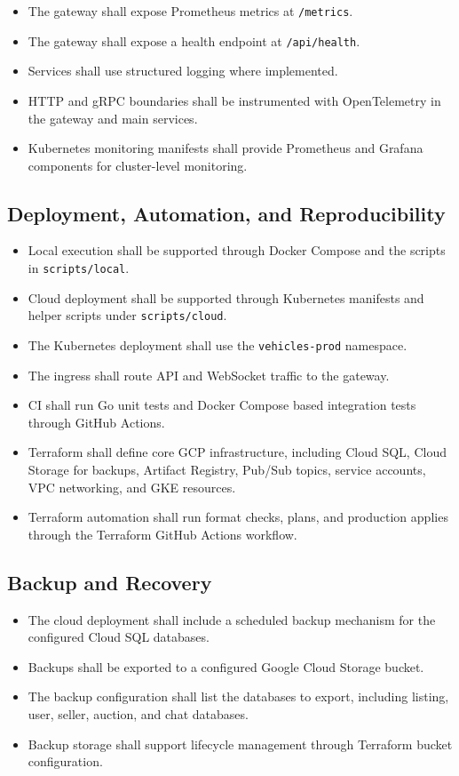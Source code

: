 \begin{itemize}
    \item The gateway shall expose Prometheus metrics at \texttt{/metrics}.
    \item The gateway shall expose a health endpoint at \texttt{/api/health}.
    \item Services shall use structured logging where implemented.
    \item HTTP and gRPC boundaries shall be instrumented with OpenTelemetry in the gateway and main services.
    \item Kubernetes monitoring manifests shall provide Prometheus and Grafana components for cluster-level monitoring.
\end{itemize}

\subsection{Deployment, Automation, and Reproducibility}

\begin{itemize}
    \item Local execution shall be supported through Docker Compose and the scripts in \texttt{scripts/local}.
    \item Cloud deployment shall be supported through Kubernetes manifests and helper scripts under \texttt{scripts/cloud}.
    \item The Kubernetes deployment shall use the \texttt{vehicles-prod} namespace.
    \item The ingress shall route API and WebSocket traffic to the gateway.
    \item CI shall run Go unit tests and Docker Compose based integration tests through GitHub Actions.
    \item Terraform shall define core GCP infrastructure, including Cloud SQL, Cloud Storage for backups, Artifact Registry, Pub/Sub topics, service accounts, VPC networking, and GKE resources.
    \item Terraform automation shall run format checks, plans, and production applies through the Terraform GitHub Actions workflow.
\end{itemize}

\subsection{Backup and Recovery}

\begin{itemize}
    \item The cloud deployment shall include a scheduled backup mechanism for the configured Cloud SQL databases.
    \item Backups shall be exported to a configured Google Cloud Storage bucket.
    \item The backup configuration shall list the databases to export, including listing, user, seller, auction, and chat databases.
    \item Backup storage shall support lifecycle management through Terraform bucket configuration.
\end{itemize}

